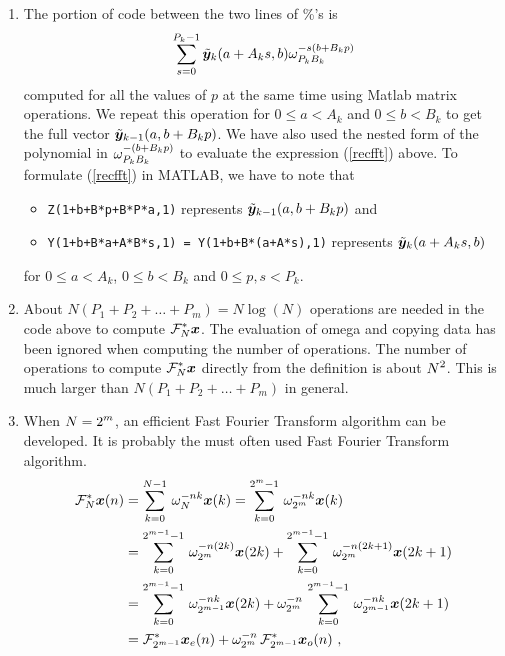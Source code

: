 \begin{rmkList}
\begin{enumerate}
\item The portion of code between the two lines of \%'s is 
\begin{equation}\label{recfft}
\sum_{s=0}^{P_k-1} \tilde{\bm{y}}_k(a+A_k s, b) \omega_{P_k B_k}^{-s(b+B_k p)}
\end{equation}
computed for all the values of $p$ at the same time using Matlab
matrix operations.  We repeat this operation for $0\leq a < A_k$ and
$0\leq b < B_k$ to get the full vector $\tilde{\bm{y}}_{k-1}(a, b+B_k p)$.
We have also used the nested form of the polynomial in
$\displaystyle \omega_{P_k B_k}^{-(b+B_k p)}$ to evaluate the expression
(\ref{recfft}) above.  To formulate (\ref{recfft}) in MATLAB, we have to
note that
\begin{itemize}
\item \verb!Z(1+b+B*p+B*P*a,1)! represents
$\tilde{\bm{y}}_{k-1}(a, b+B_k p)$ and
\item \verb!Y(1+b+B*a+A*B*s,1) = Y(1+b+B*(a+A*s),1)! represents
$\tilde{\bm{y}}_k(a+A_k s, b)$
\end{itemize}
for $0\leq a < A_k$, $0\leq b<B_k$ and $0\leq p,s < P_k$.
\item About $N(P_1+P_2+\ldots+P_m) = N \log(N)$ operations are needed
in the code above to compute $\displaystyle \mathcal{F}^\ast_N \bm{x}$.  The evaluation
of omega and copying data has been ignored when computing the number
of operations.  The number of operations to compute
$\displaystyle \mathcal{F}^\ast_N\bm{x}$ directly from the definition is
about $\displaystyle N^2$.
This is much larger than $N(P_1+P_2+\ldots+P_m)$ in general.
\item When $\displaystyle N=2^m$, an efficient Fast Fourier Transform
algorithm can be developed.  It is probably the must often used Fast Fourier
Transform algorithm.
\begin{align*}
\mathcal{F}^\ast_N \bm{x}(n)
&= \sum_{k=0}^{N-1} \, \omega_N^{-nk} \bm{x}(k)
= \sum_{k=0}^{2^m-1} \, \omega_{2^m}^{-nk} \bm{x}(k) \\
&= \sum_{k=0}^{2^{m-1}-1} \, \omega_{2^m}^{-n(2k)} \bm{x}(2k) +
\sum_{k=0}^{2^{m-1}-1} \, \omega_{2^m}^{-n(2k+1)} \bm{x}(2k+1) \\
&= \sum_{k=0}^{2^{m-1}-1} \, \omega_{2^{m-1}}^{-nk} \bm{x}(2k) +
\omega_{2^m}^{-n} \,
\sum_{k=0}^{2^{m-1}-1} \, \omega_{2^{m-1}}^{-nk} \bm{x}(2k+1) \\
&= \mathcal{F}^\ast_{2^{m-1}} \bm{x}_{e}(n) +
\omega_{2^m}^{-n} \, \mathcal{F}^\ast_{2^{m-1}} \bm{x}_{o}(n) \ ,
\end{align*}

\end{enumerate}
\end{rmkList}
